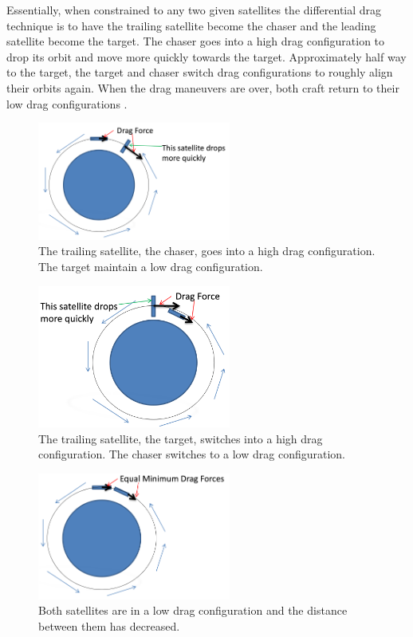 \documentclass[journal,a4paper,12pt]{IEEEtran}
\begin{document}
Essentially, when constrained to any two given satellites the differential drag
technique is to have the trailing satellite become the chaser and the leading
satellite become the target. The chaser goes into a high drag configuration to
drop its orbit and move more quickly towards the target. Approximately half way
to the target, the target and chaser switch drag configurations to roughly align
their orbits again. When the drag maneuvers are over, both craft return to their
low drag configurations \cite{sanny}.

\begin{figure}[h!]
  \centering
  \includegraphics[width=2.5in]{img/ayee1}
  \caption{The trailing satellite, the chaser, goes into a high drag configuration.
  The target maintain a low drag configuration.}
\end{figure}
\begin{figure}[h!]
  \centering
  \includegraphics[width=2.5in]{img/ayee2}
  \caption{The trailing satellite, the target, switches into a high drag configuration.
  The chaser switches to a low drag configuration.}
\end{figure}
\begin{figure}[h!]
  \centering
  \includegraphics[width=2.5in]{img/ayee3}
  \caption{Both satellites are in a low drag configuration and the distance between
  them has decreased.}
  \label{oof}
\end{figure}
\end{document}
